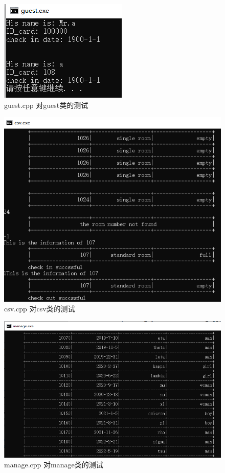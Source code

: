 \documentclass[UTF8]{ctexart}
\begin{document}
    \begin{figure}[H]
        \centering
        \includegraphics[scale=1]{test_guest}
        \caption{guest.cpp 对guest类的测试}
        \label{fig:test_guest}
      \end{figure}
    \begin{figure}[H]
        \centering
        \includegraphics[scale=0.4]{test_csv}
        \caption{csv.cpp 对csv类的测试}
        \label{fig:test_csv}
      \end{figure}
    \begin{figure}[H]
        \centering
        \includegraphics[scale=0.4]{test_manage}
        \caption{manage.cpp 对manage类的测试}
        \label{fig:test_manage}
      \end{figure}
\end{document}
